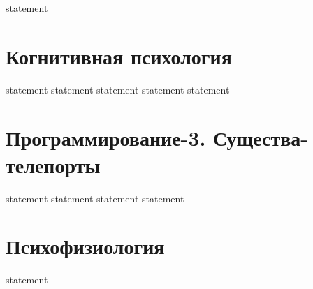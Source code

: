 {statement}

\section{Когнитивная психология}

{statement}
{statement}
{statement}
{statement}
{statement}

\section{Программирование-3. Существа-телепорты}

{statement}
{statement}
{statement}
{statement}

\section{Психофизиология}

{statement}